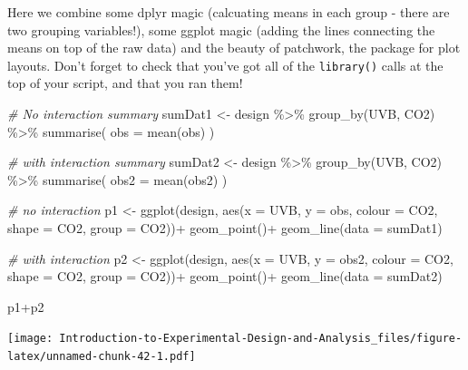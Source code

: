 \documentclass[
]{book}
\newenvironment{Shaded}{\begin{snugshade}}{\end{snugshade}}
\newcommand{\AttributeTok}[1]{\textcolor[rgb]{0.77,0.63,0.00}{#1}}
\newcommand{\CommentTok}[1]{\textcolor[rgb]{0.56,0.35,0.01}{\textit{#1}}}
\newcommand{\FunctionTok}[1]{\textcolor[rgb]{0.00,0.00,0.00}{#1}}
\newcommand{\NormalTok}[1]{#1}
\newcommand{\OtherTok}[1]{\textcolor[rgb]{0.56,0.35,0.01}{#1}}
\newcommand{\SpecialCharTok}[1]{\textcolor[rgb]{0.00,0.00,0.00}{#1}}
\begin{document}
Here we combine some dplyr magic (calcuating means in each group - there are two grouping variables!), some ggplot magic (adding the lines connecting the means on top of the raw data) and the beauty of patchwork, the package for plot layouts. Don't forget to check that you've got all of the \texttt{library()} calls at the top of your script, and that you ran them!

\begin{Shaded}
\begin{Highlighting}[]
\CommentTok{\# No interaction summary}
\NormalTok{sumDat1 }\OtherTok{\textless{}{-}}\NormalTok{ design }\SpecialCharTok{\%\textgreater{}\%} 
  \FunctionTok{group\_by}\NormalTok{(UVB, CO2) }\SpecialCharTok{\%\textgreater{}\%} 
  \FunctionTok{summarise}\NormalTok{(}
    \AttributeTok{obs =} \FunctionTok{mean}\NormalTok{(obs)}
\NormalTok{  )}

\CommentTok{\# with interaction summary}
\NormalTok{sumDat2 }\OtherTok{\textless{}{-}}\NormalTok{ design }\SpecialCharTok{\%\textgreater{}\%} 
  \FunctionTok{group\_by}\NormalTok{(UVB, CO2) }\SpecialCharTok{\%\textgreater{}\%} 
  \FunctionTok{summarise}\NormalTok{(}
    \AttributeTok{obs2 =} \FunctionTok{mean}\NormalTok{(obs2)}
\NormalTok{  )}

\CommentTok{\# no interaction}
\NormalTok{p1 }\OtherTok{\textless{}{-}} \FunctionTok{ggplot}\NormalTok{(design, }\FunctionTok{aes}\NormalTok{(}\AttributeTok{x =}\NormalTok{ UVB, }\AttributeTok{y =}\NormalTok{ obs, }\AttributeTok{colour =}\NormalTok{ CO2, }\AttributeTok{shape =}\NormalTok{ CO2, }\AttributeTok{group =}\NormalTok{ CO2))}\SpecialCharTok{+}
  \FunctionTok{geom\_point}\NormalTok{()}\SpecialCharTok{+}
  \FunctionTok{geom\_line}\NormalTok{(}\AttributeTok{data =}\NormalTok{ sumDat1)}

\CommentTok{\# with interaction}
\NormalTok{p2 }\OtherTok{\textless{}{-}} \FunctionTok{ggplot}\NormalTok{(design, }\FunctionTok{aes}\NormalTok{(}\AttributeTok{x =}\NormalTok{ UVB, }\AttributeTok{y =}\NormalTok{ obs2, }\AttributeTok{colour =}\NormalTok{ CO2, }\AttributeTok{shape =}\NormalTok{ CO2, }\AttributeTok{group =}\NormalTok{ CO2))}\SpecialCharTok{+}
  \FunctionTok{geom\_point}\NormalTok{()}\SpecialCharTok{+}
  \FunctionTok{geom\_line}\NormalTok{(}\AttributeTok{data =}\NormalTok{ sumDat2)}

\NormalTok{p1}\SpecialCharTok{+}\NormalTok{p2}
\end{Highlighting}
\end{Shaded}

\texttt{[image: Introduction-to-Experimental-Design-and-Analysis\_files/figure-latex/unnamed-chunk-42-1.pdf]}
\end{document}
